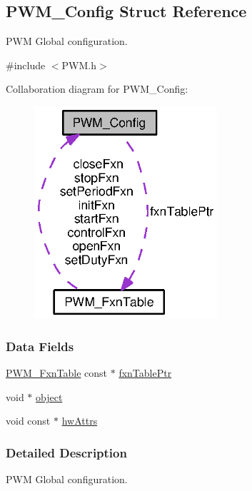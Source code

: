 \subsection{P\+W\+M\+\_\+\+Config Struct Reference}
\label{struct_p_w_m___config}


P\+W\+M Global configuration.  




{\ttfamily \#include $<$P\+W\+M.\+h$>$}



Collaboration diagram for P\+W\+M\+\_\+\+Config\+:
\nopagebreak
\begin{figure}[H]
\begin{center}
\leavevmode
\includegraphics[width=192pt]{struct_p_w_m___config__coll__graph}
\end{center}
\end{figure}
\subsubsection*{Data Fields}
\begin{DoxyCompactItemize}
\item 
\hyperlink{struct_p_w_m___fxn_table}{P\+W\+M\+\_\+\+Fxn\+Table} const $\ast$ \hyperlink{struct_p_w_m___config_ac02604d8e0fafc8b5ff71171a4bf3461}{fxn\+Table\+Ptr}
\item 
void $\ast$ \hyperlink{struct_p_w_m___config_a33c57f0fe6b8af13f7a9c8ec392019a6}{object}
\item 
void const $\ast$ \hyperlink{struct_p_w_m___config_a2299aba19683340f917ca962a9536148}{hw\+Attrs}
\end{DoxyCompactItemize}


\subsubsection{Detailed Description}
P\+W\+M Global configuration. 

